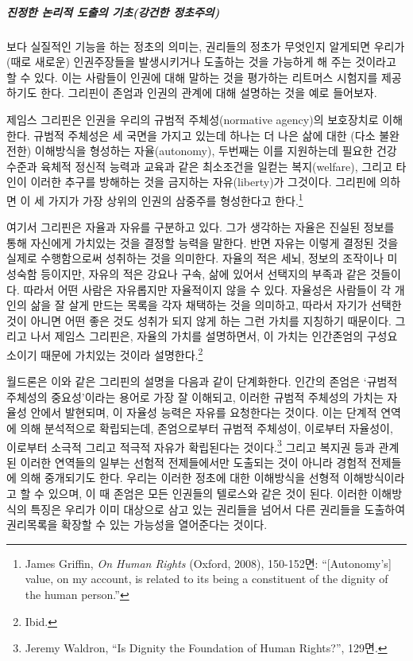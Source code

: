 \subparagraph{진정한 논리적 도출의 기초(강건한 정초주의)}

보다 실질적인 기능을 하는 정초의 의미는, 권리들의 정초가 무엇인지 알게되면 우리가 (때로 새로운) 인권주장들을 발생시키거나 도출하는 것을 가능하게 해 주는 것이라고 할 수 있다. 이는 사람들이 인권에 대해 말하는 것을 평가하는 리트머스 시험지를 제공하기도 한다. 그리핀이 존엄과 인권의 관계에 대해 설명하는 것을 예로 들어보자.

제임스 그리핀은 인권을 우리의 규범적 주체성(normative agency)의 보호장치로 이해한다. 규범적 주체성은 세 국면을 가지고 있는데 하나는 더 나은 삶에 대한 (다소 불완전한) 이해방식을 형성하는 자율(autonomy), 두번째는 이를 지원하는데 필요한 건강수준과 육체적 정신적 능력과 교육과 같은 최소조건을 일컫는 복지(welfare), 그리고 타인이 이러한 추구를 방해하는 것을 금지하는 자유(liberty)가 그것이다. 그리핀에 의하면 이 세 가지가 가장 상위의 인권의 삼중주를 형성한다고 한다.\footnote{James Griffin, \emph{On Human Rights} (Oxford, 2008), 150-152면: ``{[}Autonomy's{]} value, on my account, is related to its being a constituent of the dignity of the human person.''}

여기서 그리핀은 자율과 자유를 구분하고 있다. 그가 생각하는 자율은 진실된 정보를 통해 자신에게 가치있는 것을 결정할 능력을 말한다. 반면 자유는 이렇게 결정된 것을 실제로 수행함으로써 성취하는 것을 의미한다. 자율의 적은 세뇌, 정보의 조작이나 미성숙함 등이지만, 자유의 적은 강요나 구속, 삶에 있어서 선택지의 부족과 같은 것들이다. 따라서 어떤 사람은 자유롭지만 자율적이지 않을 수 있다. 자율성은 사람들이 각 개인의 삶을 잘 살게 만드는 목록을 각자 채택하는 것을 의미하고, 따라서 자기가 선택한 것이 아니면 어떤 좋은 것도 성취가 되지 않게 하는 그런 가치를 지칭하기 때문이다. 그리고 나서 제임스 그리핀은, 자율의 가치를 설명하면서, 이 가치는 인간존엄의 구성요소이기 때문에 가치있는 것이라 설명한다.\footnote{Ibid.}

월드론은 이와 같은 그리핀의 설명을 다음과 같이 단계화한다. 인간의 존엄은 `규범적주체성의 중요성'이라는 용어로 가장 잘 이해되고, 이러한 규범적 주체성의 가치는 자율성 안에서 발현되며, 이 자율성 능력은 자유를 요청한다는 것이다. 이는 단계적 연역에 의해 분석적으로 확립되는데, 존엄으로부터 규범적 주체성이, 이로부터 자율성이, 이로부터 소극적 그리고 적극적 자유가 확립된다는 것이다.\footnote{Jeremy Waldron, ``Is Dignity the Foundation of Human Rights?'', 129면.} 그리고 복지권 등과 관계된 이러한 연역들의 일부는 선험적 전제들에서만 도출되는 것이 아니라 경험적 전제들에 의해 중개되기도 한다. 우리는 이러한 정초에 대한 이해방식을 선형적 이해방식이라고 할 수 있으며, 이 때 존엄은 모든 인권들의 텔로스와 같은 것이 된다. 이러한 이해방식의 특징은 우리가 이미 대상으로 삼고 있는 권리들을 넘어서 다른 권리들을 도출하여 권리목록을 확장할 수 있는 가능성을 열어준다는 것이다.

